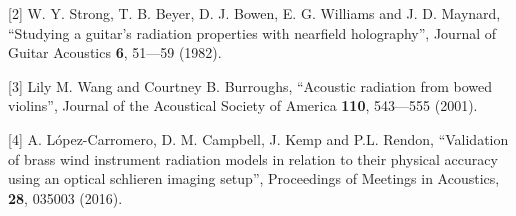   [2] W. Y. Strong, T. B. Beyer, D. J. Bowen, E. G. Williams and J. D. Maynard, 
  “Studying a guitar’s radiation properties with nearfield holography”, Journal 
  of Guitar Acoustics \textbf{6}, 51—59 (1982). 

  [3] Lily M. Wang and Courtney B. Burroughs, “Acoustic radiation from bowed 
  violins”, Journal of the Acoustical Society of America \textbf{110}, 543—555 
  (2001). 

  [4] A. López-Carromero, D. M. Campbell, J. Kemp and P.L. Rendon, “Validation 
  of brass wind instrument radiation models in relation to their physical 
  accuracy using an optical schlieren imaging setup”, Proceedings of Meetings 
  in Acoustics, \textbf{28}, 035003 (2016). 